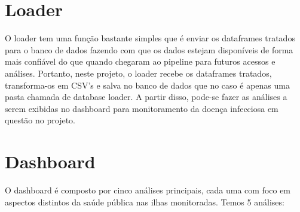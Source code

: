 \documentclass[a4paper,12pt]{article}
\begin{document}
\section{Loader}

O loader tem uma função bastante simples que é enviar os dataframes tratados para o banco de dados fazendo com que os dados estejam disponíveis de forma mais confiável do que quando chegaram ao pipeline para futuros acessos e análises. Portanto, neste projeto, o loader recebe os dataframes tratados, transforma-os em CSV's e salva no banco de dados que no caso é apenas uma pasta chamada de database loader. A partir disso, pode-se fazer as análises a serem exibidas no dashboard para monitoramento da doença infecciosa em questão no projeto.


\section{Dashboard}


O dashboard é composto por cinco análises principais, cada uma com foco em aspectos distintos da saúde pública nas ilhas monitoradas. Temos 5 análises:
\end{document}
